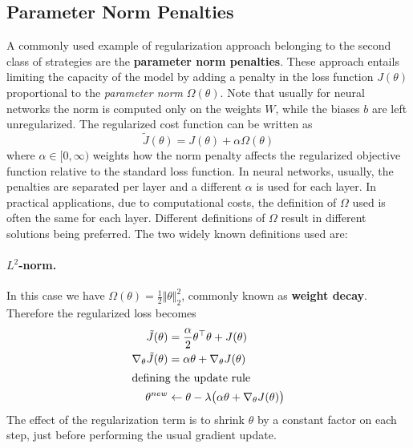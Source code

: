 \subsection{Parameter Norm Penalties} \label{subsec:parameter_norm}
A commonly used example of regularization approach belonging to the second class of strategies are the \textbf{parameter norm penalties}. These approach entails limiting the capacity of the model by adding a penalty in the loss function $J(\theta)$ proportional to the \textit{parameter norm} $\Omega(\theta)$. Note that usually for neural networks the norm is computed only on the weights $W$, while the biases $b$ are left unregularized. The regularized cost function can be written as
\begin{equation}
    \tilde{J}(\theta) = J(\theta) + \alpha \Omega(\theta)
\end{equation}
where $\alpha \in [0, \infty)$ weights how the norm penalty affects the regularized objective function relative to the standard loss function. In neural networks, usually, the penalties are separated per layer and a different $\alpha$ is used for each layer. In practical applications, due to computational costs, the definition of $\Omega$ used is often the same for each layer. Different definitions of $\Omega$ result in different solutions being preferred. The two widely known definitions used are:

\paragraph{$L^2$-norm.} In this case we have $\Omega(\theta) = \frac{1}{2}\Vert \theta \Vert_{2}^{2}$, commonly known as \textbf{weight decay}. Therefore the regularized loss becomes
\begin{align*}
    \tilde{J}(\theta) &= \frac{\alpha}{2} \theta^\top \theta + J(\theta)\\
    \nabla_{\theta} \tilde{J}(\theta) &= \alpha \theta + \nabla_{\theta} J(\theta)\\
    \intertext{defining the update rule}
    \theta^{new} &\leftarrow \theta - \lambda \big( \alpha\theta + \nabla_{\theta}J(\theta) \big)
\end{align*}
The effect of the regularization term is to shrink $\theta$ by a constant factor on each step, just before performing the usual gradient update.

